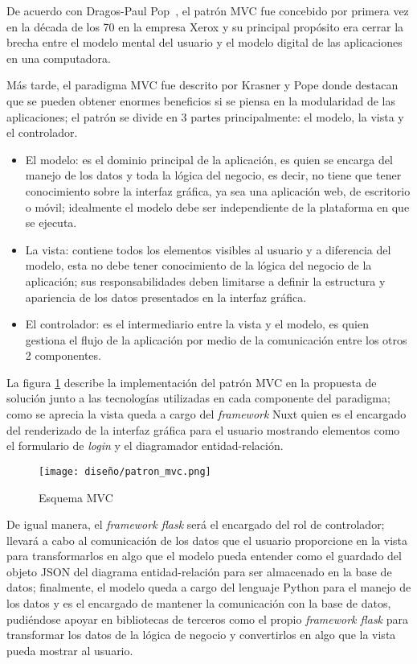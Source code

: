 De acuerdo con Dragos-Paul Pop~\cite{pop_designing_2014}, el patrón MVC fue concebido por primera vez en la década de los 70 en la empresa Xerox y su principal propósito era cerrar la brecha entre el modelo mental del usuario y el modelo digital de las aplicaciones en una computadora.


Más tarde, el paradigma MVC fue descrito por Krasner y Pope\cite{pope_cookbook_1988} donde destacan que se pueden obtener enormes beneficios si se piensa en la modularidad de las aplicaciones; el patrón se divide en 3 partes principalmente: el modelo, la vista y el controlador.

\begin{itemize}
    \item El modelo: es el dominio principal de la aplicación, es quien se encarga del manejo de los datos y toda la lógica del negocio, es decir, no tiene que tener conocimiento sobre la interfaz gráfica, ya sea una aplicación web, de escritorio o móvil; idealmente el modelo debe ser independiente de la plataforma en que se ejecuta.
    \item La vista: contiene todos los elementos visibles al usuario y a diferencia del modelo, esta no debe tener conocimiento de la lógica del negocio de la aplicación; sus responsabilidades deben limitarse a definir la estructura y apariencia de los datos presentados en la interfaz gráfica.
    \item El controlador: es el intermediario entre la vista y el modelo, es quien gestiona el flujo de la aplicación por medio de la comunicación entre los otros 2 componentes.
\end{itemize}

La figura \ref{img:mvc_implementation} describe la implementación del patrón MVC en la propuesta de solución junto a las tecnologías utilizadas en cada componente del paradigma; como se aprecia la vista queda a cargo del \textit{framework} Nuxt quien es el encargado del renderizado de la interfaz gráfica para el usuario mostrando elementos como el formulario de \textit{login} y el diagramador entidad-relación.

\begin{figure}[H]
  \centering
  \texttt{[image: diseño/patron\_mvc.png]}
  \caption{Esquema MVC}
  \label{img:mvc_implementation}
\end{figure}


De igual manera, el \textit{framework flask} será el encargado del rol de controlador; llevará a cabo al comunicación de los datos que el usuario proporcione en la vista para transformarlos en algo que el modelo pueda entender como el guardado del objeto JSON del diagrama entidad-relación para ser almacenado en la base de datos; finalmente, el modelo queda a cargo del lenguaje Python para el manejo de los datos y es el encargado de mantener la comunicación con la base de datos, pudiéndose apoyar en bibliotecas de terceros como el propio \textit{framework flask} para transformar los datos de la lógica de negocio y convertirlos en algo que la vista pueda mostrar al usuario.
